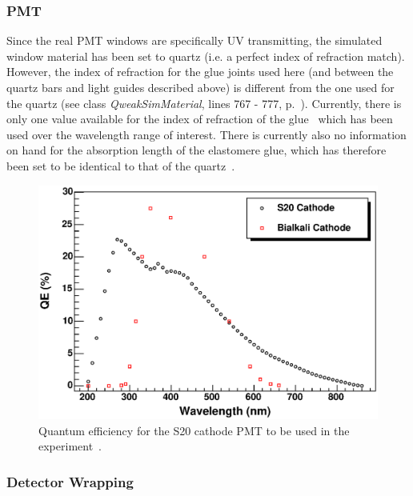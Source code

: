 \subsubsection{PMT}

Since the real PMT windows are specifically UV transmitting, the
simulated window material has been set to quartz (i.e. a perfect index
of refraction match). However, the index of refraction for the glue
joints used here (and between the quartz bars and light guides
described above) is different from the one used for the quartz (see
class {\it QweakSimMaterial}, lines 767 - 777,
p.~\pageref{SourceXVII13}). Currently, there is only one value
available for the index of refraction of the glue~\cite{pc:MACK1}
which has been used over the wavelength range of interest. There is
currently also no information on hand for the absorption length of the
elastomere glue, which has therefore been set to be identical to that
of the quartz~\cite{tn:BABAR}. 

\begin{figure}[h]
  \hspace{0cm}
  \includegraphics[scale=0.6]{./figures5/PMTCathQE.eps}
  \caption{Quantum efficiency for the S20 cathode PMT to be used in the
           experiment~\cite{PC:EELECTRONTUBES}.}
           \label{fig:PMTQE}
\end{figure}

\subsubsection{Detector Wrapping}

